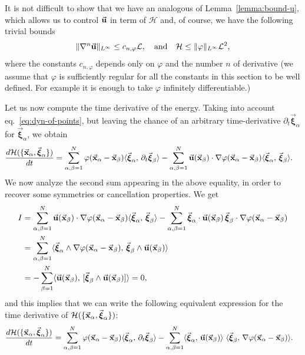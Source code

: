 \documentclass[a4paper,11pt]{article}
\numberwithin{equation}{section}
\newcommand{\la}{\langle}
\newcommand{\ra}{\rangle}
\newcommand{\U}{\mbox{$\vec{\bf u}$}}
\newcommand{\x}{\mbox{$\vec{\bf x}$}}
\newcommand{\bxi}{\mbox{$\vec{\boldsymbol \xi}$}}
\begin{document}
It is not difficult to show that we have an analogous of
Lemma~\ref{lemma:bound-u}, which allows us to control $\U$ in term of
$\mathcal{H}$ and, of course, we have the following trivial bounds
\begin{equation*}
\|\nabla^n \U\|_{L^\infty} \le c_{n,\varphi} \mathcal{L}, \quad
\text{and}\quad
\mathcal{H} \le \|\varphi\|_{L^\infty} \mathcal{L}^2,  
\end{equation*}
where the constants $c_{n,\varphi}$ depends only on $\varphi$ and the
number $n$ of derivative (we assume that $\varphi$ is
sufficiently regular for all the constants in this section to be well
defined. For example it is enough to take $\varphi$ infinitely
differentiable.)\par
%
Let us now compute the time derivative of the energy. Taking into
account eq.~\eqref{eq:dyn-of-points}, but leaving the chance of an
arbitrary time-derivative $\partial_t\bxi_\alpha$ for $\bxi_\alpha$,
we obtain 
\begin{equation*}
  \begin{split}
 \frac{d\mathcal{H}(\{\x_\alpha, \bxi_\alpha\})}{dt}&
=\sum_{\alpha,\beta=1}^N 
\varphi(\x_\alpha-\x_\beta)\la\bxi_\alpha,\,\partial_t\bxi_\beta\ra-
\sum_{\alpha,\beta=1}^N \U(\x_\beta)\cdot \nabla 
\varphi(\x_\alpha-\x_\beta) \la\bxi_\alpha,\,\bxi_\beta\ra.
\end{split} 
\end{equation*}
We now analyze the second sum appearing in the above equality, in
order to recover some symmetries or cancellation properties. We get
\begin{equation*}
  \begin{split}
I & = \sum_{\alpha,\beta=1}^N \U(\x_\beta)\cdot \nabla
 \varphi(\x_\alpha-\x_\beta)
 \la\bxi_\alpha,\,\bxi_\beta\ra-\sum_{\alpha,\beta=1}^N
 \bxi_{\alpha}\cdot \U(\x_\beta)\, \bxi_\beta\cdot \nabla
 \varphi(\x_\alpha-\x_\beta) \\ 
& = \sum_{\alpha, \beta=1}^N \langle\bxi_\alpha \wedge \nabla
\varphi(\x_\alpha-\x_\beta),\,\bxi_\beta\wedge\U(\x_\beta)\rangle\\ 
&=-\sum_{\beta=1}^N
 \la\U(\x_\beta),\,[\bxi_\beta\wedge\U(\x_\beta)]\ra=0, 
  \end{split} 
\end{equation*}
and this implies that we can write the following equivalent expression
for the time derivative of $\mathcal{H}(\{\x_\alpha,\bxi_\alpha\})$: 
\begin{equation*}
  \begin{split}
 \frac{d\mathcal{H}(\{\x_\alpha,\bxi_\alpha\}) }{dt}& =
\sum_{\alpha,\beta=1}^N \varphi(\x_\alpha-\x_\beta)
\la\bxi_\alpha,\,\partial_t\bxi_\beta\ra -\sum_{\alpha,\beta=1}^N
\la\bxi_{\alpha},\,\U(\x_\beta)\ra\ \la\bxi_\beta ,\,\nabla
\varphi(\x_\alpha-\x_\beta)\ra.  
  \end{split}
\end{equation*}
\end{document}
